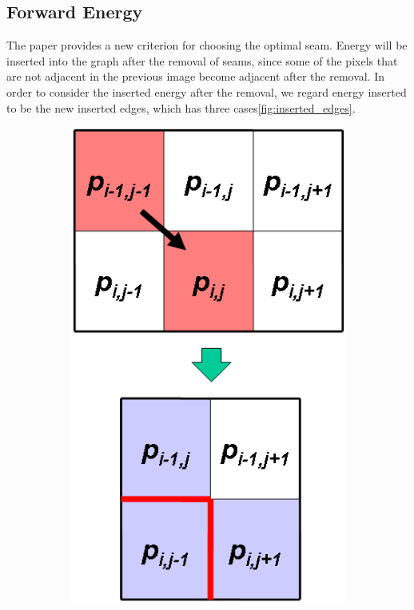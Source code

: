 \documentclass[final]{cvpr}
\begin{document}
\subsection{Forward Energy}
The paper\cite{rubinstein2008improved} provides a new criterion for choosing the optimal seam.
Energy will be inserted into the graph after the removal of seams, since some of the pixels that are not adjacent in the previous image become adjacent after the removal.
In order to consider the inserted energy after the removal, we regard energy inserted to be the new inserted edges, which has three cases\ref{fig:inserted_edges}.
\begin{figure}[htb]
\begin{center}
\begin{subfigure}[b]{0.30\linewidth}
    \includegraphics[width=\textwidth]{edge0.png}

\end{subfigure}
\end{center}
\end{figure}
\end{document}
